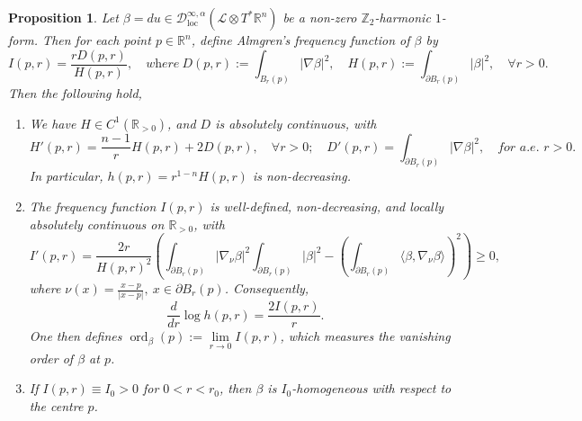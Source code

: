 \documentclass[11pt,a4paper]{article}
\numberwithin{equation}{section}%
\newtheorem{prop}[thm]{Proposition}
\theoremstyle{definition}
\newcommand{\R}{\mathbb{R}}
\newcommand{\Z}{\mathbb{Z}}
\begin{document}
\begin{prop}\label{prop:freqofdu}
    Let $\beta=du\in \mathcal{D}^{\infty,\alpha}_{\operatorname{loc}}(\mathcal{L}\otimes T^*\R^n)$ be a non-zero $\Z_2$-harmonic $1$-form. Then for each point $p\in \R^n$, define Almgren's frequency function of $\beta$ by
    $$I(p,r)=\frac{r D(p,r)}{H(p,r)},\quad \textit{where}~D(p,r):=\int_{B_r(p)}|\nabla \beta|^2,\quad H(p,r):=\int_{\partial B_r(p)}|\beta|^2,\quad \forall r>0.$$
    Then the following hold,
    \begin{enumerate}
        \item [\textnormal{(1)}] We have $H\in C^1(\R_{>0})$, and $D$ is absolutely continuous, with
        \begin{equation}
        \label{eqn:diffofDH}
            H'(p,r)=\frac{n-1}{r}H(p,r)+2D(p,r),\quad \forall r>0;\quad D'(p,r)=\int_{\partial B_r(p)}|\nabla \beta|^2,\quad \textit{for a.e. } r>0.
        \end{equation}
        In particular, $h(p,r)=r^{1-n}H(p,r)$ is non-decreasing.    

        \item [\textnormal{(2)}] The frequency function $I(p,r)$ is well-defined, non-decreasing, and locally absolutely continuous on $\R_{>0}$, with  
        \begin{equation}
        \label{eqn:dfreq}
            I'(p,r)=\frac{2r}{H(p,r)^2} 
        \left(\int_{\partial B_r(p)}|\nabla_\nu  \beta|^2\int_{\partial B_r(p)}|\beta|^2-\left(\int_{\partial B_r(p)}\langle\beta,\nabla_\nu \beta\rangle\right)^2\right)\geqslant0,
        \end{equation}
        where $\nu(x)=\frac{x-p}{|x-p|}, ~x\in \partial B_r(p)$.
        Consequently,
        \begin{equation}
            \label{eqn:HtoI}
            \frac{d}{dr}\log h(p,r)=\frac{2I(p,r)}{r}.
        \end{equation}
        One then defines $\operatorname{ord}_\beta(p):=\lim\limits_{r\to 0} I(p,r)$, which measures the vanishing order of $\beta$ at $p$. 
        \item [\textnormal{(3)}] If $I(p,r)\equiv I_0>0$ for $0<r<r_0$, then $\beta$ is $I_0$-homogeneous with respect to the centre $p$.
    \end{enumerate}
\end{prop}
\end{document}
